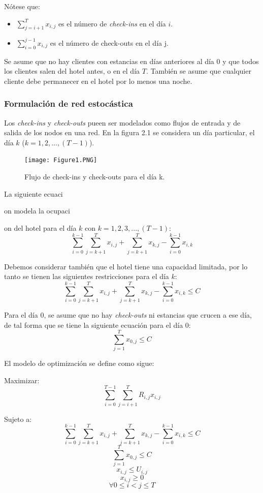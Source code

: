 {Nótese que:

\begin{itemize}
  \item $\sum_{j=i+1}^{T} x_{i,j}$ es el número de \emph{check-ins} en el día $i$.
  \item $\sum_{i=0}^{j-1} x_{i,j}$ es el número de check-outs en el día j.
\end{itemize}

Se asume que no hay clientes con estancias en días anteriores al día 0 y que todos los clientes salen del hotel antes, o en el día $T$. También se asume que cualquier cliente debe permanecer en el hotel por lo menos una noche.

\subsubsection*{Formulación de red estocástica}

Los \emph{check-ins} y \emph{check-outs} pueen ser modelados como flujos de entrada y de salida de los nodos en una red. En la figura 2.1 se considera un día particular, el día $k$ ($k={1,2,...,(T-1)}$).

\begin{figure}
  \texttt{[image: Figure1.PNG]}
  \caption{Flujo de check-ins y check-outs para el día k.}
  \label{fig:Figure2.2}
\end{figure}

La siguiente ecuaci{on modela la ocupaci{on del hotel para el día $k$ con $k = 1,2,3,...,(T-1)$:$$\sum_{i=0}^{k-1}\sum_{j=k+1}^{T} x_{i,j} + \sum_{j=k+1}^{T} x_{k,j} - \sum_{i=0}^{k-1} x_{i,k}$$

Debemos considerar también que el hotel tiene una capacidad limitada, por lo tanto se tienen las siguientes restricciones para el día $k$:
$$\sum_{i=0}^{k-1}\sum_{j=k+1}^{T} x_{i,j} + \sum_{j=k+1}^{T} x_{k,j} - \sum_{i=0}^{k-1} x_{i,k} \leq C$$

Para el día 0, se asume que no hay \emph{check-outs} ni estancias que crucen a ese día, de tal forma que se tiene la siguiente ecuación para el día 0: 
$$\sum_{j=1}^{T} x_{0,j} \leq C$$

El modelo de optimización se define como sigue:

Maximizar: $$\sum_{i=0}^{T-1}\sum_{j=i+1}^{T} R_{i,j}x_{i,j}$$

Sujeto a: $$\sum_{i=0}^{k-1}\sum_{j=k+1}^{T} x_{i,j} + \sum_{j=k+1}^{T} x_{k,j} - \sum_{i=0}^{k-1} x_{i,k} \leq C$$
$$\sum_{j=1}^{T} x_{0,j} \leq C$$
$$x_{i,j} \leq U_{i,j}$$
$$x_{i,j} \geq 0$$
$$\forall 0\leq i < j \leq T$$

}}}
